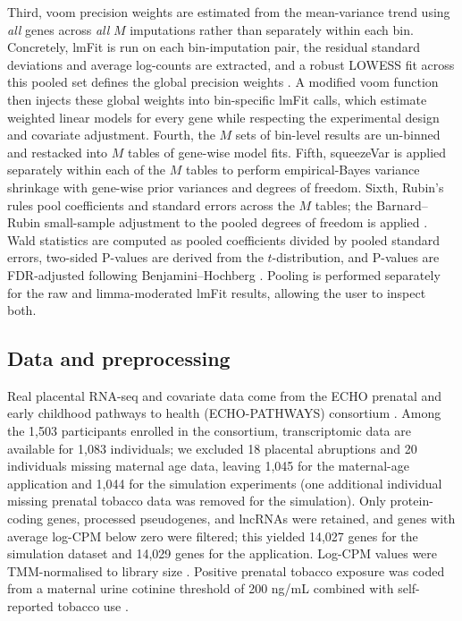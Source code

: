 \documentclass[11pt]{article}
\begin{document}
Third, voom precision weights are estimated from the mean-variance trend using \emph{all} genes across \emph{all} $M$ imputations rather than separately within each bin. Concretely, lmFit \citep{ritchie2015limma} is run on each bin-imputation pair, the residual standard deviations and average log-counts are extracted, and a robust LOWESS fit across this pooled set defines the global precision weights \citep{law2014voom}. A modified voom function then injects these global weights into bin-specific lmFit calls, which estimate weighted linear models for every gene while respecting the experimental design and covariate adjustment. Fourth, the $M$ sets of bin-level results are un-binned and restacked into $M$ tables of gene-wise model fits. Fifth, squeezeVar is applied separately within each of the $M$ tables to perform empirical-Bayes variance shrinkage with gene-wise prior variances and degrees of freedom. Sixth, Rubin's rules \citep{rubin1987multiple,marshall2009combining} pool coefficients and standard errors across the $M$ tables; the Barnard--Rubin small-sample adjustment to the pooled degrees of freedom is applied \citep{barnard1999smalls}. Wald statistics are computed as pooled coefficients divided by pooled standard errors, two-sided P-values are derived from the $t$-distribution, and P-values are FDR-adjusted following Benjamini--Hochberg \citep{benjamini1995controlling}. Pooling is performed separately for the raw and limma-moderated lmFit results, allowing the user to inspect both.

\subsection{Data and preprocessing}

Real placental RNA-seq and covariate data come from the ECHO prenatal and early childhood pathways to health (ECHO-PATHWAYS) consortium \citep{paulson2022lewinn,paquette2023placental}. Among the 1,503 participants enrolled in the consortium, transcriptomic data are available for 1,083 individuals; we excluded 18 placental abruptions and 20 individuals missing maternal age data, leaving 1,045 for the maternal-age application and 1,044 for the simulation experiments (one additional individual missing prenatal tobacco data was removed for the simulation). Only protein-coding genes, processed pseudogenes, and lncRNAs were retained, and genes with average log-CPM below zero were filtered; this yielded 14,027 genes for the simulation dataset and 14,029 genes for the application. Log-CPM values were TMM-normalised to library size \citep{robinson2010tmm}. Positive prenatal tobacco exposure was coded from a maternal urine cotinine threshold of 200 ng/mL combined with self-reported tobacco use \citep{thyssen2011smoke}.
\end{document}
